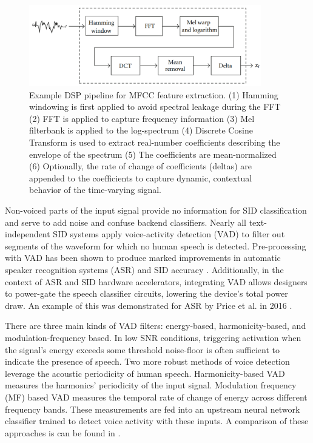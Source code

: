 \documentclass[journal,12pt,onecolumn,draftclsnofoot,]{sty/IEEEtran}
\begin{document}
\begin{figure}
\centering
\includegraphics[width=0.9\textwidth]{figs/mfcc.png}
\caption{Example DSP pipeline for MFCC feature extraction. (1) Hamming windowing is first applied to avoid spectral leakage during the FFT (2) FFT is applied to capture frequency information (3) Mel filterbank is applied to the log-spectrum (4) Discrete Cosine Transform is used to extract real-number coefficients describing the envelope of the spectrum (5) The coefficients are mean-normalized (6) Optionally, the rate of change of coefficients (deltas) are appended to the coefficients to capture dynamic, contextual behavior of the time-varying signal. \cite{fpga_gmm}}
\label{mfcc}
\end{figure}

Non-voiced parts of the input signal provide no information for SID classification and serve to add noise and confuse backend classifiers. Nearly all text-independent SID systems apply voice-activity detection (VAD) to filter out segments of the waveform for which no human speech is detected. Pre-processing with VAD has been shown to produce marked improvements in automatic speaker recognition systems (ASR) and SID accuracy \cite{vad_hmf}. Additionally, in the context of ASR and SID hardware accelerators, integrating VAD allows designers to power-gate the speech classifier circuits, lowering the device’s total power draw. An example of this was demonstrated for ASR by Price et al. in 2016 \cite{price_dnn}.

There are three main kinds of VAD filters: energy-based, harmonicity-based, and modulation-frequency based. In low SNR conditions, triggering activation when the signal’s energy exceeds some threshold noise-floor is often sufficient to indicate the presence of speech. Two more robust methods of voice detection leverage the acoustic periodicity of human speech. Harmonicity-based VAD measures the harmonics’ periodicity of the input signal. Modulation frequency (MF) based VAD measures the temporal rate of change of energy across different frequency bands. These measurements are fed into an upstream neural network classifier trained to detect voice activity with these inputs. A comparison of these approaches is can be found in \cite{price_dnn}.

\newpage



\end{document}
